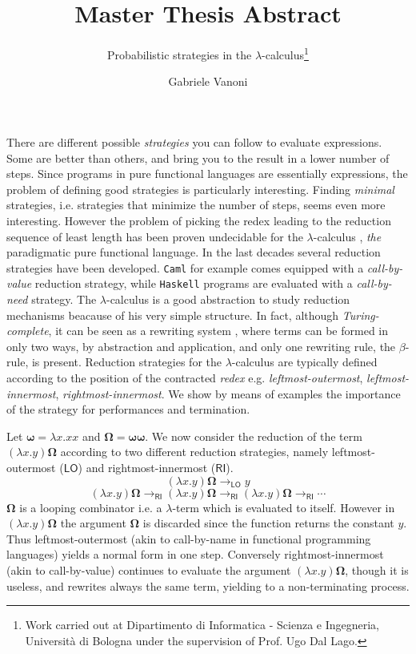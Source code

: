 \documentclass[english]{llncs}
\newcommand{\redlo}{\longrightarrow_\pslo}
\newcommand{\redri}{\longrightarrow_\psri}
\newcommand{\pslo}{\mathsf{LO}}
\newcommand{\psri}{\mathsf{RI}}
\begin{document}
\title{Master Thesis Abstract}
\subtitle{Probabilistic strategies in the $\lambda$-calculus\thanks{Work carried out at Dipartimento di Informatica - Scienza e Ingegneria, Università di Bologna under the supervision of Prof. Ugo Dal Lago.}}
\author{Gabriele Vanoni}
\maketitle
There are different possible \emph{strategies} you can follow to evaluate expressions. Some are better than others, and bring you to the result in a lower number of steps. Since programs in pure functional languages are essentially expressions, the problem of defining good strategies is particularly interesting. Finding \emph{minimal} strategies, i.e. strategies that minimize the number of steps, seems even more interesting. However the problem of picking the redex leading to the reduction sequence of least length has been proven undecidable for the $\lambda$-calculus \cite[Section~13.5]{barendregt_lambda_1984}, \emph{the} paradigmatic pure functional language. In the last decades several reduction strategies have been developed. \texttt{Caml} for example comes equipped with a \emph{call-by-value} reduction strategy, while \texttt{Haskell} programs are evaluated with a \emph{call-by-need} strategy. The $\lambda$-calculus is a good abstraction to study reduction mechanisms beacause of his very simple structure. In fact, although \emph{Turing-complete}, it can be seen as a rewriting system \cite{terese_term_2003}, where terms can be formed in only two ways, by abstraction and application, and only one rewriting rule, the $\beta$-rule, is present. Reduction strategies for the $\lambda$-calculus are typically defined according to the position of the contracted \emph{redex} e.g. \emph{leftmost-outermost}, \emph{leftmost-innermost}, \emph{rightmost-innermost}. We show by means of examples the importance of the strategy for performances and termination.
\begin{example}
	Let $\bm{\omega}=\lambda x.xx$ and $\bm{\Omega}=\bm{\omega\omega}$. We now consider the reduction of the term $(\lambda x.y)\bm{\Omega}$ according to two different reduction strategies, namely leftmost-outermost ($\pslo$) and rightmost-innermost ($\psri$).
	$$
	(\lambda x.y)\bm{\Omega}\redlo y
	$$
	$$
	(\lambda x.y)\bm{\Omega}\redri(\lambda x.y)\bm{\Omega}\redri(\lambda x.y)\bm{\Omega}\redri\cdots
	$$
	$\bm{\Omega}$ is a looping combinator i.e. a $\lambda$-term which is evaluated to itself. However in $(\lambda x.y)\bm{\Omega}$ the argument $\bm{\Omega}$ is discarded since the function returns the constant $y$. Thus leftmost-outermost (akin to call-by-name in functional programming languages) yields a normal form in one step. Conversely rightmost-innermost (akin to call-by-value) continues to evaluate the argument $(\lambda x.y)\bm{\Omega}$, though it is useless, and rewrites always the same term, yielding to a non-terminating process.
\end{example}
\end{document}
